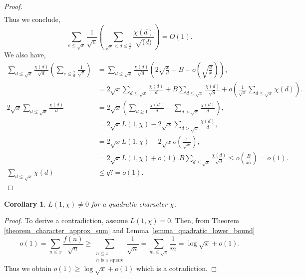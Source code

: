 \documentclass{article}
\newtheorem{corollary}{Corollary} [section]
\begin{document}
\begin{proof}
\begin{align*}
    \end{align*}
    Thus we conclude,
    \begin{equation*}
      \sum_{e\leq\sqrt{x}}{\frac 1 {\sqrt{e}}}\left(\sum_{\sqrt{x}<d\leq {\frac x e}}{\frac {\chi(d)} {\sqrt(d)}}\right) = O(1).
    \end{equation*}
    We also have,
    \begin{align*}
      \sum_{d\leq \sqrt{x}}{\frac {\chi(d)} {\sqrt{d}}}\left(\sum_{e\leq {\frac x d}}{\frac 1 {\sqrt{e}}}\right) & = \sum_{d\leq \sqrt{x}}{\frac {\chi(d)} {\sqrt{d}}}\left(2\sqrt{{\frac x d}}+B+o\left(\sqrt{{\frac d x}}\right)\right),\\
      & = 2\sqrt{x}\sum_{d\leq \sqrt{x}}{\frac {\chi(d)} {d}}+B\sum_{d\leq \sqrt{x}} {\frac {\chi(d)} {\sqrt{d}}}+o\left({\frac 1 {\sqrt{x}}}\sum_{d\leq\sqrt{x}}\chi(d)\right).\\
      2\sqrt{x}\sum_{d\leq \sqrt{x}}{\frac {\chi(d)} {d}} & = 2\sqrt{x}\left(\sum_{d\geq 1}{\frac {\chi(d)} {d}}-\sum_{d>\sqrt{x}} {\frac {\chi(d)} {d}}\right),\\
      & = 2\sqrt{x}L(1,\chi)-2\sqrt{x}\sum_{d>\sqrt{x}}{\frac {\chi(d)} {d}},\\
      & =  2\sqrt{x}L(1,\chi) - 2\sqrt{x}o\left({\frac 1 {\sqrt{x}}}\right),\\
      & = 2\sqrt{x}L(1,\chi)+o(1).
      B\sum_{d\leq \sqrt{x}}{\frac {\chi(d)} {\sqrt{d}}}\leq o\left({\frac B {x^{{\frac 1 4}}}}\right) = o(1).\\
      \sum_{d\leq \sqrt{x}}\chi(d) &\leq q? =o(1).
    \end{align*}
  \end{proof}
  \begin{corollary}
    $L(1,\chi)\not=0$ for a quadratic character $\chi$. 
  \end{corollary}
  \begin{proof}
    To derive a contradiction, assume $L(1,\chi) = 0$. Then, from Theorem \ref{theorem_character_approx_sum} and Lemma \ref{lemma_quadratic_lower_bound}
    \begin{equation*}
      o(1) = \sum_{n\leq x}{\frac {f(n)} {\sqrt{n}}} \geq \sum_{\substack{n\leq x\\ \text{$n$ is a square}}}{\frac 1 {\sqrt{n}}} = \sum_{m\leq\sqrt{x}}{\frac 1 m} = \log\sqrt{x}+o(1).
    \end{equation*}
    Thus we obtain $o(1)\geq \log\sqrt{x}+o(1)$ which is a cotradiction.
  \end{proof}
\end{document}

